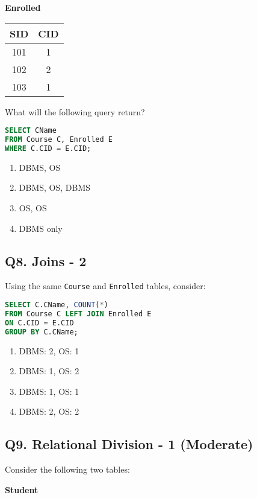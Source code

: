 \textbf{Enrolled}

\begin{tabular}{|c|c|}
\hline
\textbf{SID} & \textbf{CID} \\
\hline
101 & 1 \\
102 & 2 \\
103 & 1 \\
\hline
\end{tabular}

What will the following query return?

\begin{lstlisting}[language=SQL]
SELECT CName 
FROM Course C, Enrolled E 
WHERE C.CID = E.CID;
\end{lstlisting}

\begin{enumerate}[label=(\alph*)]
    \item DBMS, OS
    \item DBMS, OS, DBMS
    \item OS, OS
    \item DBMS only
\end{enumerate}

\subsection*{Q8. Joins - 2}
Using the same \texttt{Course} and \texttt{Enrolled} tables, consider:

\begin{lstlisting}[language=SQL]
SELECT C.CName, COUNT(*)
FROM Course C LEFT JOIN Enrolled E
ON C.CID = E.CID
GROUP BY C.CName;
\end{lstlisting}

\begin{enumerate}[label=(\alph*)]
    \item DBMS: 2, OS: 1
    \item DBMS: 1, OS: 2
    \item DBMS: 1, OS: 1
    \item DBMS: 2, OS: 2
\end{enumerate}

\subsection*{Q9. Relational Division - 1 (Moderate)}
Consider the following two tables:

\textbf{Student}

